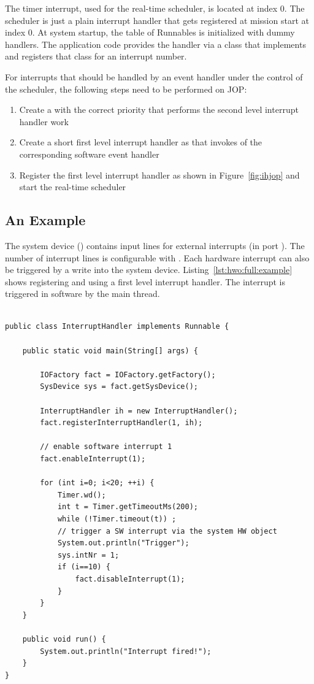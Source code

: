 The timer interrupt, used for the real-time scheduler, is located at
index 0. The scheduler is just a plain interrupt handler that gets
registered at mission start at index 0. At system startup, the table
of Runnables is initialized with dummy handlers. The application code
provides the handler via a class that implements  and
registers that class for an interrupt number.

For interrupts that should be handled by an event handler under the
control of the scheduler, the following steps need to be performed on
JOP:
\begin{enumerate}
  \item Create a  with the correct priority that
      performs the second level interrupt handler work
  \item Create a short first level interrupt handler as
       that invokes  of the
      corresponding software event handler
  \item Register the first level interrupt handler as shown in
      Figure~\ref{fig:ihjop} and start the real-time scheduler
\end{enumerate}


\subsection{An Example}

The system device () contains input lines for
external interrupts (in port ). The number of interrupt
lines is configurable with . Each hardware
interrupt can also be triggered by a write into the system device.
Listing~\ref{lst:hwo:full:example} shows registering and using a
first level interrupt handler. The interrupt is triggered in software
by the main thread.

\begin{lstlisting}[caption={Interrupt register/deregister methods in the factory class},
label=lst:hwo:full:example]

public class InterruptHandler implements Runnable {

    public static void main(String[] args) {

        IOFactory fact = IOFactory.getFactory();
        SysDevice sys = fact.getSysDevice();

        InterruptHandler ih = new InterruptHandler();
        fact.registerInterruptHandler(1, ih);

        // enable software interrupt 1
        fact.enableInterrupt(1);

        for (int i=0; i<20; ++i) {
            Timer.wd();
            int t = Timer.getTimeoutMs(200);
            while (!Timer.timeout(t)) ;
            // trigger a SW interrupt via the system HW object
            System.out.println("Trigger");
            sys.intNr = 1;
            if (i==10) {
                fact.disableInterrupt(1);
            }
        }
    }

    public void run() {
        System.out.println("Interrupt fired!");
    }
}
\end{lstlisting}


